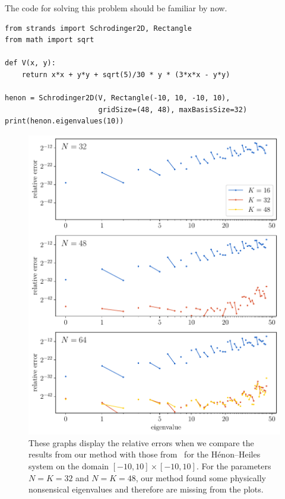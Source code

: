 The code for solving this problem should be familiar by now.
\begin{verbatim}
from strands import Schrodinger2D, Rectangle
from math import sqrt

def V(x, y):
    return x*x + y*y + sqrt(5)/30 * y * (3*x*x - y*y)

henon = Schrodinger2D(V, Rectangle(-10, 10, -10, 10),
                      gridSize=(48, 48), maxBasisSize=32)
print(henon.eigenvalues(10))
\end{verbatim}

\begin{figure}
    \begin{center}
        \includegraphics[width=\textwidth]{img/chapter4/nm_test_henon.pdf}
    \end{center}
    \caption{These graphs display the relative errors when we compare the results from our method with those from~\cite{wang_new_2009} for the Hénon--Heiles system on the domain $[-10, 10]\times[-10, 10]$. For the parameters $N = K = 32$ and $N = K = 48$, our method found some physically nonsensical eigenvalues and therefore are missing from the plots.}
    \label{fig:c4_nm_henon_test}
\end{figure}

